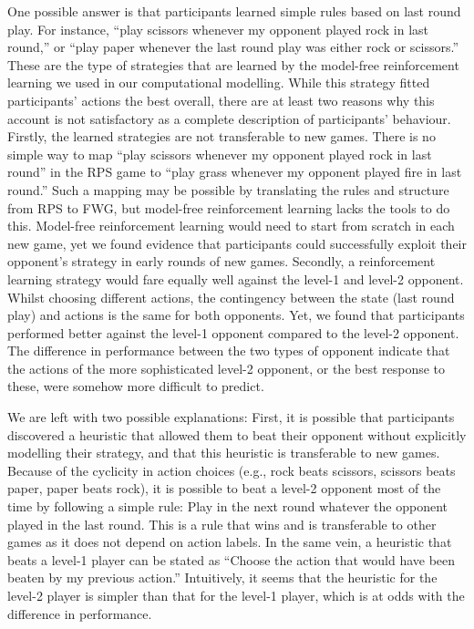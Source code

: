 \documentclass[
  english,
  man,floatsintext]{apa6}
\begin{document}
One possible answer is that participants learned simple rules based on last round play. For instance, ``play scissors whenever my opponent played rock in last round,'' or ``play paper whenever the last round play was either rock or scissors.'' These are the type of strategies that are learned by the model-free reinforcement learning we used in our computational modelling. While this strategy fitted participants' actions the best overall, there are at least two reasons why this account is not satisfactory as a complete description of participants' behaviour. Firstly, the learned strategies are not transferable to new games. There is no simple way to map ``play scissors whenever my opponent played rock in last round'' in the RPS game to ``play grass whenever my opponent played fire in last round.'' Such a mapping may be possible by translating the rules and structure from RPS to FWG, but model-free reinforcement learning lacks the tools to do this. Model-free reinforcement learning would need to start from scratch in each new game, yet we found evidence that participants could successfully exploit their opponent's strategy in early rounds of new games. Secondly, a reinforcement learning strategy would fare equally well against the level-1 and level-2 opponent. Whilst choosing different actions, the contingency between the state (last round play) and actions is the same for both opponents. Yet, we found that participants performed better against the level-1 opponent compared to the level-2 opponent. The difference in performance between the two types of opponent indicate that the actions of the more sophisticated level-2 opponent, or the best response to these, were somehow more difficult to predict.

We are left with two possible explanations: First, it is possible that participants discovered a heuristic that allowed them to beat their opponent without explicitly modelling their strategy, and that this heuristic is transferable to new games. Because of the cyclicity in action choices (e.g., rock beats scissors, scissors beats paper, paper beats rock), it is possible to beat a level-2 opponent most of the time by following a simple rule: Play in the next round whatever the opponent played in the last round. This is a rule that wins and is transferable to other games as it does not depend on action labels. In the same vein, a heuristic that beats a level-1 player can be stated as ``Choose the action that would have been beaten by my previous action.'' Intuitively, it seems that the heuristic for the level-2 player is simpler than that for the level-1 player, which is at odds with the difference in performance.
\end{document}
